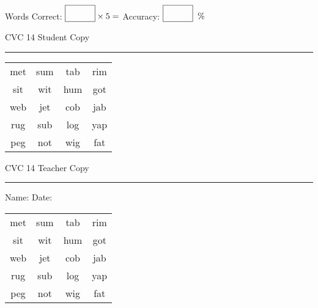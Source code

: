 \documentclass{memoir}
\begin{document}
\small

Words Correct: $\fbox{\phantom{\huge 100}} \times 5 = $ Accuracy: $\fbox{\phantom{\huge 100}}\;\; \%$ 

\vfill

\newpage


\footnotesize \noindent
CVC 14 \hfill Student Copy
\smallskip
\hrule

\Large

\setlength{\tabcolsep}{14pt}
\def\arraystretch{2}

{\selectfont


\begin{vplace}[0.5]
\begin{center}
\begin{tabular}{cccc}
met & sum & tab & rim \\
sit & wit & hum & got \\
web & jet & cob & jab \\
rug & sub & log & yap \\
peg & not & wig & fat \\
\end{tabular}
\end{center}
\end{vplace}

}

\newpage

\footnotesize \noindent
CVC 14 \hfill Teacher Copy
\smallskip
\hrule

\small

\vfill

\noindent
Name: \underline{\hspace{1.75in}} \hfill Date: \underline{\hspace{1in}}

\Large

{\selectfont


\begin{vplace}[0.5]
\begin{center}
\begin{tabular}{cccc}
met & sum & tab & rim \\
sit & wit & hum & got \\
web & jet & cob & jab \\
rug & sub & log & yap \\
peg & not & wig & fat \\
\end{tabular}
\end{center}
\end{vplace}



}
\end{document}
